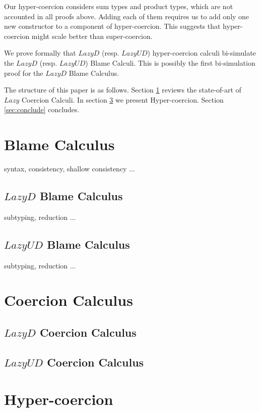 \documentclass[acmsmall,review,anonymous]{acmart}\settopmatter{printfolios=true,printccs=false,printacmref=false}
\begin{document}
Our hyper-coercion considers sum types and product types, which are not 
accounted in all proofs above. Adding each of them requires us to add only one 
new constructor to a component of hyper-coercion. This suggests that 
hyper-coercion might scale better than super-coercion.

We prove formally that $ Lazy D $ (resp. $ Lazy UD $) hyper-coercion calculi 
bi-simulate the $ Lazy D $ (resp. $ Lazy UD $) Blame Calculi. This is possibly 
the first bi-simulation proof for the $ Lazy D $ Blame Calculus.

The structure of this paper is as follows. Section \ref{sec:blame-calculus} 
reviews the state-of-art of $Lazy$ Coercion Calculi. In section 
\ref{sec:hyper-coercion} we present Hyper-coercion. Section \ref{sec:conclude} 
concludes.

\section{Blame Calculus} \label{sec:blame-calculus}

syntax, consistency, shallow consistency ...

\subsection{$Lazy D$ Blame Calculus}

subtyping, reduction ...

\subsection{$Lazy UD$ Blame Calculus}

subtyping, reduction ...

\section{Coercion Calculus}

\subsection{$Lazy D$ Coercion Calculus}

\subsection{$Lazy UD$ Coercion Calculus}

\section{Hyper-coercion} \label{sec:hyper-coercion}
\end{document}
